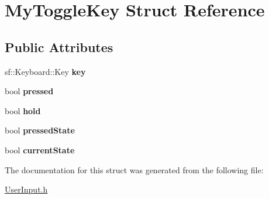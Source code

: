 \hypertarget{struct_my_toggle_key}{}\section{My\+Toggle\+Key Struct Reference}
\label{struct_my_toggle_key}
\subsection*{Public Attributes}
\begin{DoxyCompactItemize}
\item 
\hypertarget{struct_my_toggle_key_a566793183a216f55f6fd8dd2f6bd17b7}{}sf\+::\+Keyboard\+::\+Key {\bfseries key}\label{struct_my_toggle_key_a566793183a216f55f6fd8dd2f6bd17b7}

\item 
\hypertarget{struct_my_toggle_key_a344c205a849b61bec7a19563824974c9}{}bool {\bfseries pressed}\label{struct_my_toggle_key_a344c205a849b61bec7a19563824974c9}

\item 
\hypertarget{struct_my_toggle_key_ade66f469ad823461b810f17c608cee77}{}bool {\bfseries hold}\label{struct_my_toggle_key_ade66f469ad823461b810f17c608cee77}

\item 
\hypertarget{struct_my_toggle_key_ad40d02499dd05ed47b9a5479bffbfc86}{}bool {\bfseries pressed\+State}\label{struct_my_toggle_key_ad40d02499dd05ed47b9a5479bffbfc86}

\item 
\hypertarget{struct_my_toggle_key_ae75f91857d2cfa13ba05f465d6ad58d9}{}bool {\bfseries current\+State}\label{struct_my_toggle_key_ae75f91857d2cfa13ba05f465d6ad58d9}

\end{DoxyCompactItemize}


The documentation for this struct was generated from the following file\+:\begin{DoxyCompactItemize}
\item 
\hyperlink{_user_input_8h}{User\+Input.\+h}\end{DoxyCompactItemize}
